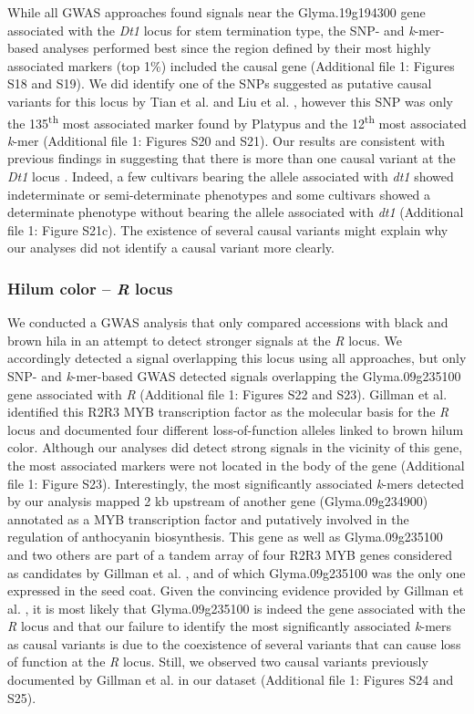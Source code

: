 \documentclass{article}
\begin{document}
While all GWAS approaches found signals near the Glyma.19g194300 gene
associated with the \textit{Dt1} locus for stem termination type, the SNP- and
\textit{k}-mer-based analyses performed best since the region defined by their
most highly associated markers (top 1\%) included the causal gene (Additional file 1: Figures
S18 and S19).
We did identify one of the SNPs suggested as putative causal variants for this
locus by Tian et al. \cite{tian2010} and Liu et al. \cite{liu2010}, however this SNP was only the
135\textsuperscript{th} most associated marker found by Platypus and the
12\textsuperscript{th} most associated \emph{k}-mer (Additional file 1: Figures
S20 and S21).
Our results are consistent with previous findings in suggesting that there is
more than one causal variant at the \textit{Dt1} locus \citep{liu2010,
tian2010}. Indeed, a few cultivars bearing the allele associated with
\emph{dt1} showed indeterminate or semi-determinate phenotypes and some
cultivars showed a determinate phenotype without bearing the allele associated
with \emph{dt1} (Additional file 1: Figure S21c). The existence of
several causal variants might explain why our analyses did not identify a
causal variant more clearly.

\subsubsection*{Hilum color -- \textit{R} locus}

We conducted a GWAS analysis that only compared accessions with black and brown
hila in an attempt to detect stronger signals at the \textit{R} locus.  We
accordingly detected a signal overlapping this locus using all approaches, but
only SNP- and \textit{k}-mer-based GWAS detected signals overlapping the
Glyma.09g235100 gene associated with \textit{R} (Additional file 1: Figures
S22 and S23).
Gillman et al. \cite{gillman2011} identified this R2R3 MYB transcription factor as the
molecular basis for the \textit{R} locus and documented four different
loss-of-function alleles linked to brown hilum color. Although our analyses did
detect strong signals in the vicinity of this gene, the most associated markers
were not located in the body of the gene (Additional file 1: Figure
S23).  Interestingly, the most significantly
associated \emph{k}-mers detected by our analysis mapped 2 kb upstream of
another gene (Glyma.09g234900) annotated as a MYB transcription factor and
putatively involved in the regulation of anthocyanin biosynthesis. This gene as
well as Glyma.09g235100 and two others are part of a tandem array of four R2R3
MYB genes considered as candidates by Gillman et al. \cite{gillman2011}, and of which
Glyma.09g235100 was the only one expressed in the seed coat. Given the
convincing evidence provided by Gillman et al. \cite{gillman2011}, it is most likely that
Glyma.09g235100 is indeed the gene associated with the \emph{R} locus and that
our failure to identify the most significantly associated \emph{k}-mers as
causal variants is due to the coexistence of several variants that can cause
loss of function at the \emph{R} locus.  Still, we observed two causal variants
previously documented by Gillman et al. \cite{gillman2011} in our dataset (Additional file 1: Figures
S24 and S25). 
\end{document}
